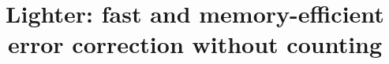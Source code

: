 \documentclass{bmcart}
\begin{document}
\graphicspath{ {./eps} }

\newcommand{\forexample}{e.g.\@\xspace}
\newcommand{\thatis}{i.e.\@\xspace}
\newcommand{\andothers}{et al.\@\xspace}
\newcommand{\kmer}{\ensuremath{k}-mer\xspace}
\newcommand{\kmers}{\ensuremath{k}-mers\xspace}
\newcommand{\tool}{Lighter\xspace}
\newcommand{\ecoli}{\emph{E. coli}\xspace}
\newcommand{\ecolinoemph}{E. coli\xspace}

\newcommand\myworries[1]{\textcolor{red}{#1}}%

\begin{frontmatter}

\begin{fmbox}

\title{Lighter: fast and memory-efficient error correction without counting}




\author[
	addressref={aff1},
	email={lsong10@jhu.edu}
]{  }
\author[
	addressref={aff2, aff1},
	email={florea@jhu.edu}
]{ }
\author[
	addressref={aff1, aff2},
	corref={aff1},
	email={langmea@cs.jhu.edu}
]{ }



\end{fmbox}
\end{frontmatter}
\end{document}
